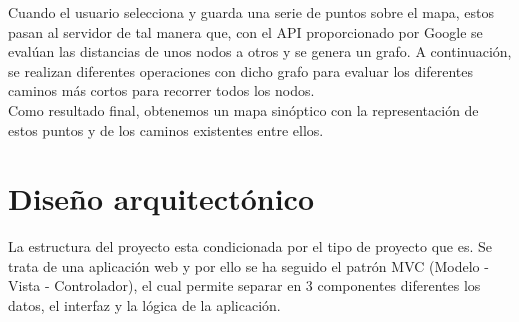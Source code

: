 Cuando el usuario selecciona y guarda una serie de puntos sobre el mapa, estos pasan al servidor de tal manera que, con el API proporcionado por Google se evalúan las distancias de unos nodos a otros y se genera un grafo. A continuación, se realizan diferentes operaciones con dicho grafo para evaluar los diferentes caminos más cortos para recorrer todos los nodos. \\
Como resultado final, obtenemos un mapa sinóptico con la representación de estos puntos y de los caminos existentes entre ellos.


\section{Diseño arquitectónico}

La estructura del proyecto esta condicionada por el tipo de proyecto que es. Se trata de una aplicación web y por ello se ha seguido el patrón MVC (Modelo - Vista - Controlador), el cual permite separar en 3 componentes diferentes los datos, el interfaz y la lógica de la aplicación. 
